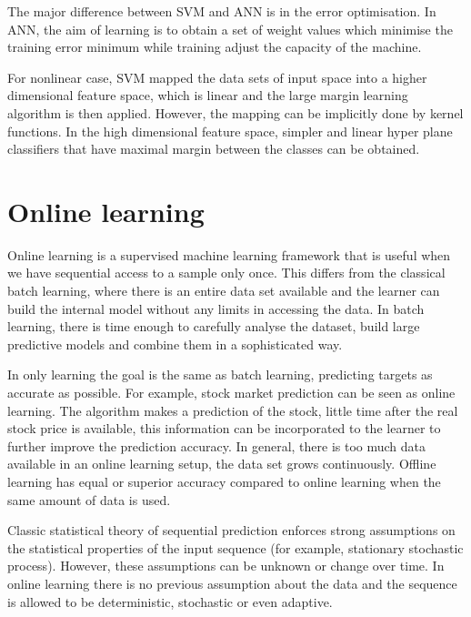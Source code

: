 The major difference between SVM and ANN is in the error optimisation. In ANN, the aim of learning is to obtain a set of weight values which minimise the training error 
minimum while training adjust the capacity of the machine. 

For nonlinear case, SVM mapped the data sets of input space into a higher dimensional feature space, which is linear and the large margin learning algorithm is then applied. However, the mapping can be implicitly done by kernel functions. In the high dimensional feature space, simpler and linear hyper plane classifiers that have maximal margin between the classes can be obtained.


\section{Online learning} \label{sec:onoffline}

Online learning is a supervised machine learning framework that is useful when we have sequential access to a sample only once.  This differs from the classical batch learning, where there is an entire data set available and the learner can build the internal model without any limits in accessing the data. In batch learning, there is time enough to carefully analyse the dataset, build large predictive models and combine them in a sophisticated way. 

In only learning the goal is the same as batch learning, predicting targets as accurate as possible. For example, stock market prediction can be seen as online learning. The algorithm makes a prediction of the stock, little time after the real stock price is available, this information can be incorporated to the learner to further improve the prediction accuracy. In general, there is too much data available in an online learning setup, the data set grows continuously. Offline learning has equal or superior accuracy compared to online learning when the same amount of data is used.

Classic statistical theory of sequential prediction enforces strong assumptions on the statistical properties of the input sequence (for example, stationary stochastic process). However, these assumptions can be unknown or change over time. In online learning there is no previous assumption about the data and the sequence is allowed to be deterministic, stochastic or even adaptive.  

